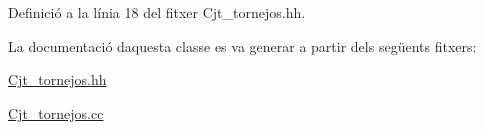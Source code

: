 Definició a la línia 18 del fitxer Cjt\+\_\+tornejos.\+hh.



La documentació d\textquotesingle{}aquesta classe es va generar a partir dels següents fitxers\+:\begin{DoxyCompactItemize}
\item 
\mbox{\hyperlink{_cjt__tornejos_8hh}{Cjt\+\_\+tornejos.\+hh}}\item 
\mbox{\hyperlink{_cjt__tornejos_8cc}{Cjt\+\_\+tornejos.\+cc}}\end{DoxyCompactItemize}
